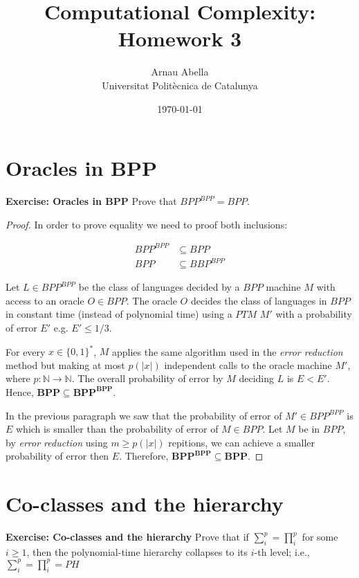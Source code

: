 \documentclass[12pt, a4paper]{article} %
\title{%
  Computational Complexity: Homework 3
}
\author{%
  Arnau Abella \\
  \large{Universitat Polit\`ecnica de Catalunya}
}
\date{\today}
\begin{document}
\maketitle


\section{Oracles in BPP}

\textbf{Exercise: Oracles in BPP} \quad Prove that ${BPP}^{BPP} = BPP$.

\begin{proof}
  In order to prove equality we need to proof both inclusions:

  \begin{align*}
    BPP^{BPP} &\subseteq BPP \\
    BPP &\subseteq BBP^{BPP}
  \end{align*}

  Let $L \in BPP^{BPP}$ be the class of languages decided by a $BPP$ machine $M$ with access to an oracle $O \in BPP$. The oracle $O$ decides the class of languages in $BPP$ in constant time (instead of polynomial time) using a $PTM$ $M'$ with a probability of error $E'$ e.g. $E' \leq 1/3$.

  For every $x \in \{0,1\}^*$, $M$ applies the same algorithm used in the \textit{error reduction} method but making at most $p(|x|)$ independent calls to the oracle machine $M'$, where $p : \mathbb{N} \to \mathbb{N}$. The overall probability of error by $M$ deciding $L$ is $E < E'$. Hence, $\mathbf{BPP \subseteq BPP^{BPP}}$.

  In the previous paragraph we saw that the probability of error of $M' \in BPP^{BPP}$ is $E$ which is smaller than the probability of error of $M \in BPP$. Let $M$ be in $BPP$, by \textit{error reduction} using $m \geq p(|x|)$ repitions, we can achieve a smaller probability of error then $E$. Therefore, $\mathbf{BPP^{BPP} \subseteq BPP}$.

\end{proof}


\section{Co-classes and the hierarchy}

\textbf{Exercise: Co-classes and the hierarchy} \quad Prove that if $\sum_i^p = \prod_i^p$ for some $i \geq 1$, then the polynomial-time hierarchy collapses to its $i$-th level; i.e., $\sum_i^p = \prod_i^p = PH$
\end{document}
